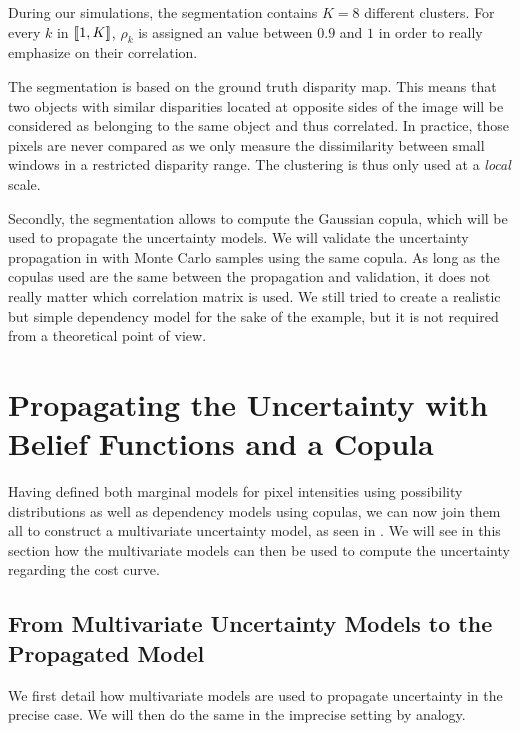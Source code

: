During our simulations, the segmentation contains $K=8$ different clusters. For every $k$ in $[\![1,K]\!]$, $\rho_k$ is assigned an value between $0.9$ and $1$ in order to really emphasize on their correlation.

\begin{remark}
    The segmentation is based on the ground truth disparity map. This means that two objects with similar disparities located at opposite sides of the image will be considered as belonging to the same object and thus correlated. In practice, those pixels are never compared as we only measure the dissimilarity between small windows in a restricted disparity range. The clustering is thus only used at a \textit{local} scale. 
    
    Secondly, the segmentation allows to compute the Gaussian copula, which will be used to propagate the uncertainty models. We will validate the uncertainty propagation in  with Monte Carlo samples using the same copula. As long as the copulas used are the same between the propagation and validation, it does not really matter which correlation matrix is used. We still tried to create a realistic but simple dependency model for the sake of the example, but it is not required from a theoretical point of view.
\end{remark}

\section{Propagating the Uncertainty with Belief Functions and a Copula}
Having defined both marginal models for pixel intensities using possibility distributions as well as dependency models using copulas, we can now join them all to construct a multivariate uncertainty model, as seen in . We will see in this section how the multivariate models can then be used to compute the uncertainty regarding the cost curve. 

\subsection{From Multivariate Uncertainty Models to the Propagated Model}
We first detail how multivariate models are used to propagate uncertainty in the precise case. We will then do the same in the imprecise setting by analogy.

